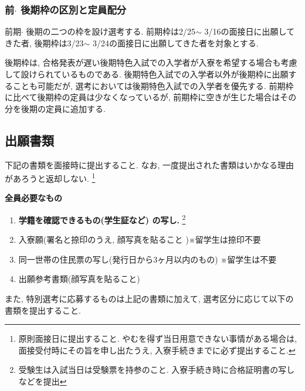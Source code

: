 \documentclass[10pt,b5jsbook,dvips,dvipdfmx,openany]{jsbook}
\theoremstyle{definition}
\begin{document}
			\subsubsection{前$ \cdot $ 後期枠の区別と定員配分}
			前期$ \cdot $ 後期の二つの枠を設け選考する. 前期枠は2/25$ \sim $ 3/16の面接日に出願してきた者, 後期枠は3/23$ \sim $ 3/24の面接日に出願してきた者を対象とする. 
	
			後期枠は, 合格発表が遅い後期特色入試での入学者が入寮を希望する場合も考慮して設けられているものである. 後期特色入試での入学者以外が後期枠に出願することも可能だが, 選考においては後期特色入試での入学者を優先する. 前期枠に比べて後期枠の定員は少なくなっているが, 前期枠に空きが生じた場合はその分を後期の定員に追加する. 

\newpage %

		\subsection{出願書類}

 		下記の書類を面接時に提出すること. なお, 一度提出された書類はいかなる理由があろうと返却しない. \footnote{原則面接日に提出すること. やむを得ず当日用意できない事情がある場合は, 面接受付時にその旨を申し出たうえ, 入寮手続きまでに必ず提出すること. }
	
 		\begin{itembox}[l]{\bf 全員必要なもの}
		\begin{enumerate}
		\item \textbf{学籍を確認できるもの(学生証など) の写し.} \footnote{受験生は入試当日は受験票を持参のこと. 入寮手続き時に合格証明書の写しなどを提出}
		\item 入寮願(署名と捺印のうえ, 顔写真を貼ること )※留学生は捺印不要
		\setcounter{mymemory}{\value{enumi}}
		\item 同一世帯の住民票の写し(発行日から3ヶ月以内のもの) ※留学生は不要
		\item 出願参考書類(顔写真を貼ること)
		\end{enumerate}
		\end{itembox}

		また, 特別選考に応募するものは上記の書類に加えて, 選考区分に応じて以下の書類を提出すること. 
\end{document}
